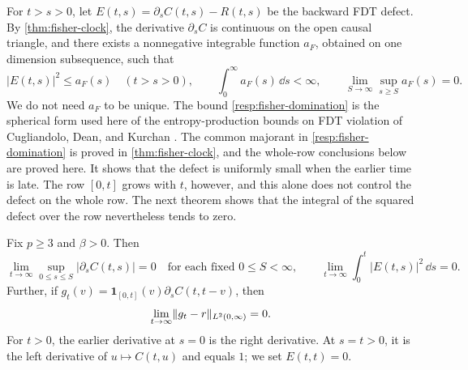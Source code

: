 For $t>s>0$, let $E(t,s)=\partial_sC(t,s)-R(t,s)$ be the backward FDT defect. By \cref{thm:fisher-clock}, the derivative $\partial_sC$ is continuous on the open causal triangle, and there exists a nonnegative integrable function $a_F$, obtained on one dimension subsequence, such that
\begin{equation}
 |E(t,s)|^2\le a_F(s)\quad(t>s>0),\qquad
 \int_0^\infty a_F(s)\,\dd s<\infty,\qquad
 \lim_{S\to\infty}\sup_{s\ge S}a_F(s)=0.
 \label{resp:fisher-domination}
\end{equation}
We do not need $a_F$ to be unique. The bound \eqref{resp:fisher-domination} is the spherical form used here of the entropy-production bounds on FDT violation of Cugliandolo, Dean, and Kurchan \cite[arXiv version~2, equations~(12)--(13), p.~3, and~(18), p.~4]{cdk1997}. The common majorant in \eqref{resp:fisher-domination} is proved in \cref{thm:fisher-clock}, and the whole-row conclusions below are proved here. It shows that the defect is uniformly small when the earlier time is late. The row $[0,t]$ grows with $t$, however, and this alone does not control the defect on the whole row. The next theorem shows that the integral of the squared defect over the row nevertheless tends to zero.

\begin{theorem}
\label{resp:backward-fdt}
Fix $p\ge3$ and $\beta>0$. Then
\begin{equation}
 \lim_{t\to\infty}\sup_{0\le s\le S}|\partial_sC(t,s)|=0
 \quad\text{for each fixed }0\le S<\infty,
 \qquad
 \lim_{t\to\infty}\int_0^t|E(t,s)|^2\,\dd s=0.
 \label{resp:backward-fdt-limit}
\end{equation}
Further, if $g_t(v)=\mathbf1_{[0,t]}(v)\partial_sC(t,t-v)$, then
\begin{equation}
 \lim_{t\to\infty}\lVert g_t-r\rVert_{L^2(0,\infty)}=0.
 \label{resp:earlier-row-limit}
\end{equation}
For $t>0$, the earlier derivative at $s=0$ is the right derivative. At $s=t>0$, it is the left derivative of $u\mapsto C(t,u)$ and equals $1$; we set $E(t,t)=0$.
\end{theorem}

